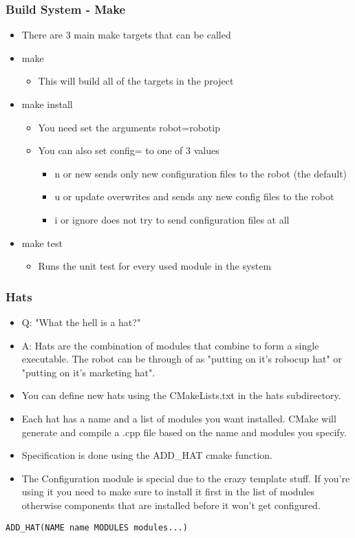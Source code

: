 \documentclass{beamer}
\begin{document}
\begin{frame}
	\frametitle{Build System - Make}
	\begin{itemize}
		\item There are 3 main make targets that can be called
		\item make
		\begin{itemize}
			\item This will build all of the targets in the project
		\end{itemize}

		\item make install
		\begin{itemize}
			\item You need set the arguments robot=robotip
			\item You can also set config= to one of 3 values
			\begin{itemize}
				\item n or new sends only new configuration files to the robot (the default)
				\item u or update overwrites and sends any new config files to the robot
				\item i or ignore does not try to send configuration files at all
			\end{itemize}
		\end{itemize}

		\item make test
		\begin{itemize}
			\item Runs the unit test for every used module in the system
		\end{itemize}
	\end{itemize}
\end{frame}

\begin{frame}[fragile]
	\frametitle{Hats}
	\begin{itemize}
		\item Q: "What the hell is a hat?"
		\item A: Hats are the combination of modules that combine to form a single executable.
			The robot can be through of as "putting on it's robocup hat" or "putting on it's marketing hat".
		\item You can define new hats using the CMakeLists.txt in the hats subdirectory.
		\item Each hat has a name and a list of modules you want installed.
			CMake will generate and compile a .cpp file based on the name and modules you specify.
		\item Specification is done using the ADD\_HAT cmake function.
		\item The Configuration module is special due to the crazy template stuff. If you're using it you
			need to make sure to install it first in the list of modules otherwise components that are installed
			before it won't get configured.
	\end{itemize}

	\begin{lstlisting}[language=nuclear-cmake]
		ADD_HAT(NAME name MODULES modules...)
	\end{lstlisting}
\end{frame}
\end{document}
